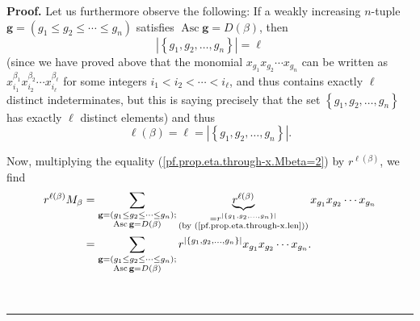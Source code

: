 \documentclass[numbers=enddot,12pt,final,onecolumn,notitlepage]{scrartcl}%
\theoremstyle{definition}
\newenvironment{proof}[1][Proof]{\noindent\textbf{#1.} }{\ \rule{0.5em}{0.5em}}
\let\sumnonlimits\sum
\renewcommand{\sum}{\sumnonlimits\limits}
\newenvironment{vershort}{}{}
\begin{document}
\begin{vershort}
\begin{proof}
Let us furthermore observe the following: If a weakly increasing $n$-tuple
$\mathbf{g}=\left(  g_{1}\leq g_{2}\leq\cdots\leq g_{n}\right)  $ satisfies
$\operatorname*{Asc}\mathbf{g}=D\left(  \beta\right)  $, then%
\[
\left\vert \left\{  g_{1},g_{2},\ldots,g_{n}\right\}  \right\vert =\ell
\]
(since we have proved above that the monomial $x_{g_{1}}x_{g_{2}}\cdots
x_{g_{n}}$ can be written as $x_{i_{1}}^{\beta_{1}}x_{i_{2}}^{\beta_{2}}\cdots
x_{i_{\ell}}^{\beta_{\ell}}$ for some integers $i_{1}<i_{2}<\cdots<i_{\ell}$,
and thus contains exactly $\ell$ distinct indeterminates, but this is saying
precisely that the set $\left\{  g_{1},g_{2},\ldots,g_{n}\right\}  $ has
exactly $\ell$ distinct elements) and thus
\begin{equation}
\ell\left(  \beta\right)  =\ell=\left\vert \left\{  g_{1},g_{2},\ldots
,g_{n}\right\}  \right\vert . \label{pf.prop.eta.through-x.len}%
\end{equation}


Now, multiplying the equality (\ref{pf.prop.eta.through-x.Mbeta=2}) by
$r^{\ell\left(  \beta\right)  }$, we find%
\begin{align}
r^{\ell\left(  \beta\right)  }M_{\beta}  &  =\sum_{\substack{\mathbf{g}%
=\left(  g_{1}\leq g_{2}\leq\cdots\leq g_{n}\right)  ;\\\operatorname*{Asc}%
\mathbf{g}=D\left(  \beta\right)  }}\underbrace{r^{\ell\left(  \beta\right)
}}_{\substack{=r^{\left\vert \left\{  g_{1},g_{2},\ldots,g_{n}\right\}
\right\vert }\\\text{(by (\ref{pf.prop.eta.through-x.len}))}}}x_{g_{1}%
}x_{g_{2}}\cdots x_{g_{n}}\nonumber\\
&  =\sum_{\substack{\mathbf{g}=\left(  g_{1}\leq g_{2}\leq\cdots\leq
g_{n}\right)  ;\\\operatorname*{Asc}\mathbf{g}=D\left(  \beta\right)
}}r^{\left\vert \left\{  g_{1},g_{2},\ldots,g_{n}\right\}  \right\vert
}x_{g_{1}}x_{g_{2}}\cdots x_{g_{n}}. \label{pf.prop.eta.through-x.qlM=}%
\end{align}



\end{proof}
\end{vershort}
\end{document}
